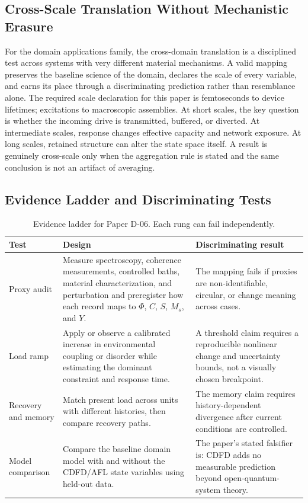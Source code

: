 \documentclass[11pt,a4paper]{article}
\begin{document}
\subsection{Cross-Scale Translation Without Mechanistic Erasure}

For the domain applications family, the cross-domain translation is a disciplined test across systems with very different material mechanisms. A valid mapping preserves the baseline science of the domain, declares the scale of every variable, and earns its place through a discriminating prediction rather than resemblance alone. \cite{Holling1973,Turing1952,Shannon1948,BakTangWiesenfeld1987}
The required scale declaration for this paper is femtoseconds to device lifetimes; excitations to macroscopic assemblies. At short
scales, the key question is whether the incoming drive is transmitted,
buffered, or diverted. At intermediate scales, response changes effective
capacity and network exposure. At long scales, retained structure can alter the
state space itself. A result is genuinely cross-scale only when the aggregation
rule is stated and the same conclusion is not an artifact of averaging.

\subsection{Evidence Ladder and Discriminating Tests}

\begin{table}[htbp]
\centering
\small
\caption{Evidence ladder for Paper D-06. Each rung can fail independently.}
\begin{tabularx}{\textwidth}{|p{}|X|X|}
\hline
\textbf{Test} & \textbf{Design} & \textbf{Discriminating result} \\
\hline
Proxy audit & Measure spectroscopy, coherence measurements, controlled baths, material characterization, and perturbation and preregister how each record maps to $\Phi$, $C$, $S$, $M_s$, and $Y$. & The mapping fails if proxies are non-identifiable, circular, or change meaning across cases. \\
\hline
Load ramp & Apply or observe a calibrated increase in environmental coupling or disorder while estimating the dominant constraint and response time. & A threshold claim requires a reproducible nonlinear change and uncertainty bounds, not a visually chosen breakpoint. \\
\hline
Recovery and memory & Match present load across units with different histories, then compare recovery paths. & The memory claim requires history-dependent divergence after current conditions are controlled. \\
\hline
Model comparison & Compare the baseline domain model with and without the CDFD/AFL state variables using held-out data. & The paper's stated falsifier is: CDFD adds no measurable prediction beyond open-quantum-system theory. \\
\hline
\end{tabularx}
\end{table}
\end{document}
